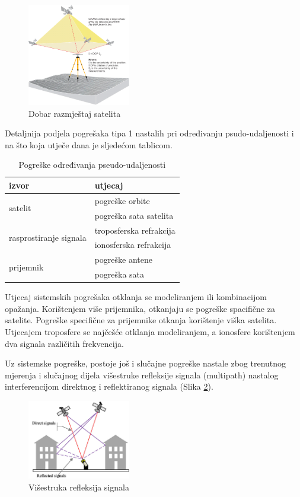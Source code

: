\documentclass[a4paper,twoside,12pt]{memoir} %
\begin{document}
	\begin{figure}[H]
		\centering
		\includegraphics[width=0.4\textwidth]{DOPHigh}
		\caption{Dobar razmještaj satelita}
		\label{fig:DOPHigh}
	\end{figure}
	
	
	
	Detaljnija podjela pogrešaka tipa 1 nastalih 
	pri određivanju psudo-udaljenosti i na što koja utječe dana je sljedećom tablicom.
	
	\begin{table}[h]\centering
		\caption{Pogreške određivanja pseudo-udaljenosti}
		\begin{tabular}{ |p{3cm}|p{4cm}| }
			\hline
			\rowcolor{lightgray} izvor & utjecaj\\[0.5ex]
			\hline\hline
			\multirow{2}{4em}{satelit} & pogreške orbite  \\ 
			& pogreška sata satelita  \\ 
			\hline
			\multirow{2}{4em}{rasprostiranje signala} & troposferska refrakcija  \\ 
			& ionosferska refrakcija  \\
			\hline
			\multirow{2}{4em}{prijemnik} & pogreške antene \\ 
			& pogreška sata  \\ 
			\hline
		\end{tabular}
	\end{table}
	Utjecaj sistemskih pogrešaka otklanja se modeliranjem ili
	kombinacijom opažanja.
	Korištenjem više prijemnika, otkanjaju se pogreške spacifične za satelite.
	Pogreške specifične za prijemnike otkanja korištenje viška satelita.
	Utjecajem troposfere se najčešće otklanja modeliranjem,
	a ionosfere korištenjem dva signala različitih frekvencija.
	
	Uz sistemske pogreške, postoje još i slučajne pogreške nastale zbog trenutnog mjerenja i slučajnog dijela
	višestruke refleksije signala (multipath) nastalog interferencijom 
	direktnog i reflektiranog signala (Slika \ref{fig:multipath}).
	\begin{figure}[H]
		\centering
		\includegraphics[width=0.4\textwidth]{multipath}
		\caption{Višestruka refleksija signala}
		\label{fig:multipath}
	\end{figure}
	
\end{document}
